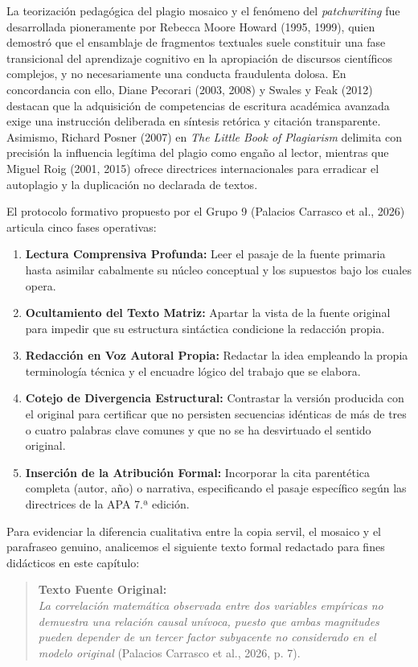 La teorización pedagógica del plagio mosaico y el fenómeno del \textit{patchwriting} fue desarrollada pioneramente por Rebecca Moore Howard (1995, 1999), quien demostró que el ensamblaje de fragmentos textuales suele constituir una fase transicional del aprendizaje cognitivo en la apropiación de discursos científicos complejos, y no necesariamente una conducta fraudulenta dolosa. En concordancia con ello, Diane Pecorari (2003, 2008) y Swales y Feak (2012) destacan que la adquisición de competencias de escritura académica avanzada exige una instrucción deliberada en síntesis retórica y citación transparente. Asimismo, Richard Posner (2007) en \textit{The Little Book of Plagiarism} delimita con precisión la influencia legítima del plagio como engaño al lector, mientras que Miguel Roig (2001, 2015) ofrece directrices internacionales para erradicar el autoplagio y la duplicación no declarada de textos.

El protocolo formativo propuesto por el Grupo 9 (Palacios Carrasco et al., 2026) articula cinco fases operativas:
\begin{enumerate}
    \item \textbf{Lectura Comprensiva Profunda:} Leer el pasaje de la fuente primaria hasta asimilar cabalmente su núcleo conceptual y los supuestos bajo los cuales opera.
    \item \textbf{Ocultamiento del Texto Matriz:} Apartar la vista de la fuente original para impedir que su estructura sintáctica condicione la redacción propia.
    \item \textbf{Redacción en Voz Autoral Propia:} Redactar la idea empleando la propia terminología técnica y el encuadre lógico del trabajo que se elabora.
    \item \textbf{Cotejo de Divergencia Estructural:} Contrastar la versión producida con el original para certificar que no persisten secuencias idénticas de más de tres o cuatro palabras clave comunes y que no se ha desvirtuado el sentido original.
    \item \textbf{Inserción de la Atribución Formal:} Incorporar la cita parentética completa (autor, año) o narrativa, especificando el pasaje específico según las directrices de la APA 7.ª edición.
\end{enumerate}

Para evidenciar la diferencia cualitativa entre la copia servil, el mosaico y el parafraseo genuino, analicemos el siguiente texto formal redactado para fines didácticos en este capítulo:

\begin{quote}
\small \textbf{Texto Fuente Original:}\\
\textsl{\guillemotleft La correlación matemática observada entre dos variables empíricas no demuestra una relación causal unívoca, puesto que ambas magnitudes pueden depender de un tercer factor subyacente no considerado en el modelo original\guillemotright} (Palacios Carrasco et al., 2026, p. 7).
\end{quote}

